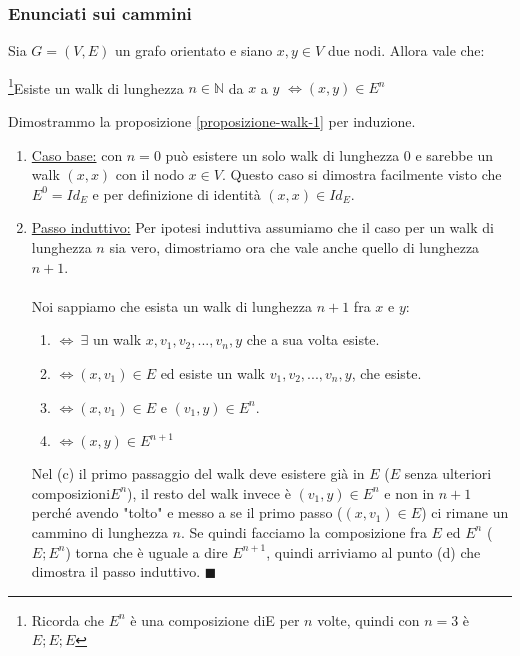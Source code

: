 \subsubsection{Enunciati sui cammini}
\begin{proposition}\label{proposizione-walk-1}
Sia $G = (V,E)$ un grafo orientato e siano $x,y \in V$ due nodi. Allora vale che:
\begin{center}
    \footnote{Ricorda che $E^n$ è una composizione di$ $E per $n$ volte, quindi con $n=3$ è $E;E;E$}Esiste un walk di lunghezza $n\in \mathbb{N}$ da $x$ a $y$ $\Longleftrightarrow (x,y) \in E^n$
\end{center}
\end{proposition}
\begin{demostration}
Dimostrammo la proposizione \ref{proposizione-walk-1} per induzione.
\begin{enumerate}
    \item \underline{Caso base:} con $n=0$ può esistere un solo walk di lunghezza 0 e sarebbe un walk $(x,x)$ con il nodo $x \in V$. Questo caso si dimostra facilmente visto che $E^0 = Id_E$ e per definizione di identità $(x,x) \in Id_E$.
    \item \underline{Passo induttivo:} Per ipotesi induttiva assumiamo che il caso per un walk di lunghezza $n$ sia vero, dimostriamo ora che vale anche quello di lunghezza $n+1$. \\ \\
    Noi sappiamo che esista un walk di lunghezza $n + 1$ fra $x$ e $y$:
    \begin{enumerate}
        \item $\Longleftrightarrow \: \exists$ un walk $x, v_1, v_2, ..., v_n, y$ che a sua volta esiste.
        \item $\Longleftrightarrow (x, v_1) \in E$ ed esiste un walk $v_1, v_2, ..., v_n, y$, che esiste.
        \item $\Longleftrightarrow (x, v_1) \in E$ e $(v_1,y) \in E^n$.
        \item $\Longleftrightarrow (x,y) \in E^{n+1}$
    \end{enumerate}
    Nel (c) il primo passaggio del walk deve esistere già in $E$ ($E$ senza ulteriori composizioni$E^n$), il resto del walk invece è $(v_1,y) \in E^n$ e non in $n+1$ perché avendo "tolto" e messo a se il primo passo ($(x, v_1) \in E$) ci rimane un cammino di lunghezza $n$. Se quindi facciamo la composizione fra $E$ ed $E^n$ ($E;E^n$) torna che è uguale a dire $E^{n+1}$, quindi arriviamo al punto (d) che dimostra il passo induttivo. $\blacksquare$
\end{enumerate}
\end{demostration}

